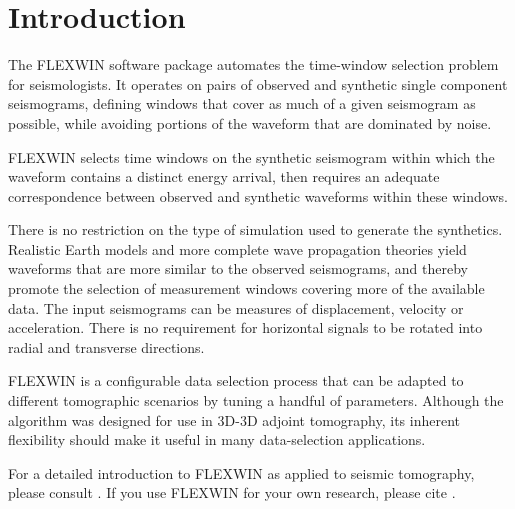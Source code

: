 \chapter{Introduction}

The FLEXWIN software package automates the time-window selection problem for
seismologists.  It operates on pairs of observed and synthetic single component
seismograms, defining windows that cover as much of a given seismogram as
possible, while avoiding portions of the waveform that are dominated by noise.  

FLEXWIN selects time windows on the synthetic seismogram within which the waveform
contains a distinct energy arrival, then requires an adequate correspondence
between observed and synthetic waveforms within these windows.

There is no restriction on the type of simulation used to
generate the synthetics. Realistic Earth models and more complete wave
propagation theories yield waveforms that are more similar to the observed
seismograms, and thereby promote the selection of measurement windows covering
more of the available data.  The input seismograms can be measures of
displacement, velocity or acceleration.  There is no requirement
for horizontal signals to be rotated into radial and transverse directions.

FLEXWIN is a configurable data selection process that can be adapted to
different tomographic scenarios by tuning a handful of parameters.  Although
the algorithm was designed for use in 3D-3D adjoint tomography, its inherent
flexibility should make it useful in many data-selection applications.

For a detailed introduction to FLEXWIN as applied to seismic tomography, please consult \cite{MaggiEtal2009}.  If you use FLEXWIN for your own research, please cite \cite{MaggiEtal2009}.


